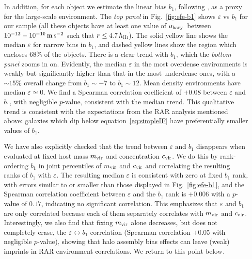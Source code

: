\documentclass[usenatbib]{mnras}
\newcommand{\Hi}{\textsc{Hi}}
\newcommand{\abary}{\ensuremath{a_{\rm bary}}}
\newcommand{\msq}{\ensuremath{{\rm \,m\,s}^{-2}}}
\newcommand{\eqn}[1]{equation~\eqref{#1}}
\begin{document}
In addition, for each object we estimate the linear bias $b_1$, following \cite{phs18}, as a proxy for the large-scale environment. 
The \emph{top panel} in Fig.~\ref{fig:efe-b1} shows $\varepsilon$ vs $b_1$ for our sample (all these objects have at least one value of \abary\ between $10^{-12}-10^{-10}\msq$ such that $r\leq4.7\,h_{\Hi}$). 
The solid yellow line shows the median $\varepsilon$ for narrow bins in $b_1$, and dashed yellow lines show the region which encloses 68\% of the objects.  There is a clear trend with $b_1$, which the \emph{bottom panel} zooms in on.  Evidently, the median $\varepsilon$ in the most overdense environments is weakly but significantly higher than that in the most underdense ones, with a $\sim15\%$ overall change from $b_1\sim-7$ to $b_1\sim12$. Mean density environments have median $\varepsilon\simeq0$. We find a Spearman correlation coefficient of $+0.08$  between $\varepsilon$ and $b_1$, with negligible $p$-value, consistent with the median trend. This qualitative trend is consistent with the expectations from the RAR analysis mentioned above: galaxies which dip below \eqn{eq:simpleIF} have preferentially smaller values of $b_1$. 


We have also explicitly checked that the trend between $\varepsilon$ and $b_1$ disappears when evaluated at fixed  host mass $m_{\rm vir}$ and concentration $c_{\rm vir}$. We do this by rank-ordering $b_1$ in joint percentiles of $m_{\rm vir}$ and $c_{\rm vir}$ and correlating the resulting ranks of $b_1$ with $\varepsilon$. The resulting median $\varepsilon$ is consistent with zero at fixed $b_1$ rank, with errors similar to or smaller than those displayed in Fig.~\ref{fig:efe-b1}, and the Spearman correlation coefficient between $\varepsilon$ and the $b_1$ rank is $+0.006$ with a $p$-value of $0.17$, indicating no significant correlation. This emphasizes that $\varepsilon$ and $b_1$ are only correlated because each of them separately correlates with $m_{\rm vir}$ and $c_{\rm vir}$. Interestingly, we also find that fixing $m_{\rm vir}$ alone decreases, but does not completely erase,  the $\varepsilon\leftrightarrow b_1$ correlation (Spearman correlation $+0.05$ with negligible $p$-value), showing that halo assembly bias effects can leave (weak) imprints in RAR-environment correlations. We return to this point below.
\end{document}
